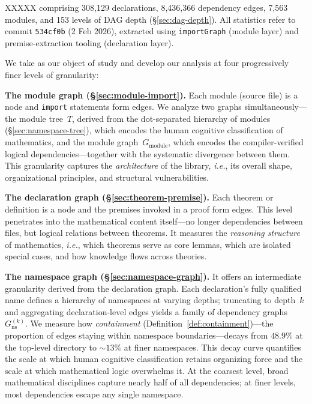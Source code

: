 XXXXX 
comprising 308,129 declarations, 8,436,366 dependency edges, 7,563 modules, and 153 levels of DAG depth (\S\ref{sec:dag-depth}). All statistics refer to commit \texttt{534cf0b} (2 Feb 2026), extracted using \texttt{importGraph} (module layer) and premise-extraction tooling (declaration layer).

We take  as our object of study and develop our analysis at four progressively finer levels of granularity:

\medskip
\noindent\textbf{The module graph (\S\ref{sec:module-import}).}
Each module (source file) is a node and \texttt{import} statements form edges. We analyze two graphs simultaneously---the module tree~$T$, derived from the dot-separated hierarchy of modules (\S\ref{sec:namespace-tree}), which encodes the human cognitive classification of mathematics, and the module graph~$G_{\mathrm{module}}$, which encodes the compiler-verified logical dependencies---together with the systematic divergence between them. This granularity captures the \emph{architecture} of the library, \emph{i.e.}, its overall shape, organizational principles, and structural vulnerabilities.

\medskip
\noindent\textbf{The declaration graph (\S\ref{sec:theorem-premise}).}
Each theorem or definition is a node and the premises invoked in a proof form edges. This level penetrates into the mathematical content itself---no longer dependencies between files, but logical relations between theorems. It measures the \emph{reasoning structure} of mathematics, \emph{i.e.}, which theorems serve as core lemmas, which are isolated special cases, and how knowledge flows across theories.

\medskip
\noindent\textbf{The namespace graph (\S\ref{sec:namespace-graph}).}
It offers an intermediate granularity derived from the declaration graph. Each declaration's fully qualified name defines a hierarchy of namespaces at varying depths; truncating to depth~$k$ and aggregating declaration-level edges yields a family of dependency graphs $G_{\mathrm{ns}}^{(k)}$. We measure how \emph{containment} (Definition~\ref{def:containment})---the proportion of edges staying within namespace boundaries---decays from $48.9\%$ at the top-level directory to ${\sim}13\%$ at finer namespaces. This decay curve quantifies the scale at which human cognitive classification retains organizing force and the scale at which mathematical logic overwhelms it. At the coarsest level, broad mathematical disciplines capture nearly half of all dependencies; at finer levels, most dependencies escape any single namespace.

